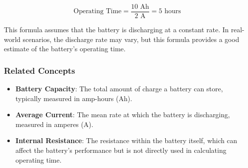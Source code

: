 \[
\text{Operating Time} = \frac{10 \text{ Ah}}{2 \text{ A}} = 5 \text{ hours}
\]

This formula assumes that the battery is discharging at a constant rate. In real-world scenarios, the discharge rate may vary, but this formula provides a good estimate of the battery's operating time.

\subsubsection{Related Concepts}
\begin{itemize}
    \item \textbf{Battery Capacity}: The total amount of charge a battery can store, typically measured in amp-hours (Ah).
    \item \textbf{Average Current}: The mean rate at which the battery is discharging, measured in amperes (A).
    \item \textbf{Internal Resistance}: The resistance within the battery itself, which can affect the battery's performance but is not directly used in calculating operating time.
\end{itemize}

